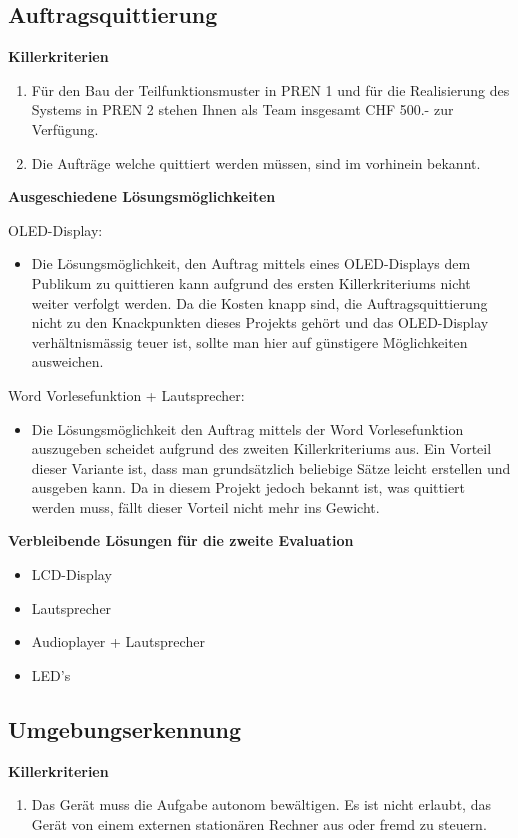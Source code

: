 \newpage
\subsection{Auftragsquittierung}
\textbf{Killerkriterien}
\begin{enumerate} 
    \item Für den Bau der Teilfunktionsmuster in PREN 1 und für die Realisierung des Systems in PREN 2 stehen Ihnen als Team insgesamt CHF 500.- zur Verfügung. 
	\item Die Aufträge welche quittiert werden müssen, sind im vorhinein bekannt.
\end{enumerate}

\textbf{Ausgeschiedene Lösungsmöglichkeiten} 

OLED-Display:
\begin{itemize}
    \item Die Lösungsmöglichkeit, den Auftrag mittels eines OLED-Displays dem Publikum zu quittieren kann aufgrund des ersten Killerkriteriums nicht weiter verfolgt werden. Da die Kosten knapp sind, die Auftragsquittierung nicht zu den Knackpunkten dieses Projekts gehört und das OLED-Display verhältnismässig teuer ist, sollte man hier auf günstigere Möglichkeiten ausweichen.
\end{itemize}

Word Vorlesefunktion + Lautsprecher:
\begin{itemize}
    \item Die Lösungsmöglichkeit den Auftrag mittels der Word Vorlesefunktion auszugeben scheidet aufgrund des zweiten Killerkriteriums aus. Ein Vorteil dieser Variante ist, dass man grundsätzlich beliebige Sätze leicht erstellen und ausgeben kann. Da in diesem Projekt jedoch bekannt ist, was quittiert werden muss, fällt dieser Vorteil nicht mehr ins Gewicht.
\end{itemize}

\textbf{Verbleibende Lösungen für die zweite Evaluation}
\begin{itemize}
    \item LCD-Display
    \item Lautsprecher
    \item Audioplayer + Lautsprecher
    \item LED's
\end{itemize}

\subsection{Umgebungserkennung}
\textbf{Killerkriterien}
\begin{enumerate} 
    \item Das Gerät muss die Aufgabe autonom bewältigen. Es ist nicht erlaubt, das Gerät von einem externen stationären Rechner aus oder fremd zu steuern.
\end{enumerate}

